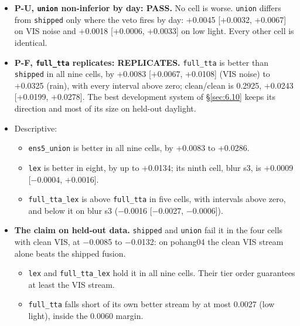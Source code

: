 \documentclass[10pt]{article}
\begin{document}
\begin{itemize}
\item \textbf{P-U, \texttt{union} non-inferior by day: PASS.} No cell is worse. \texttt{union} differs from \texttt{shipped} only where the veto fires by day: +0.0045 [+0.0032, +0.0067] on VIS noise and +0.0018 [+0.0006, +0.0033] on low light. Every other cell is identical.
\item \textbf{P-F, \texttt{full\_\allowbreak{}tta} replicates: REPLICATES.} \texttt{full\_\allowbreak{}tta} is better than \texttt{shipped} in all nine cells, by +0.0083 [+0.0067, +0.0108] (VIS noise) to +0.0325 (rain), with every interval above zero; clean/clean is 0.2925, +0.0243 [+0.0199, +0.0278]. The best development system of \S\ref{sec:6.10} keeps its direction and most of its size on held-out daylight.
\item Descriptive:
\begin{itemize}
\item \texttt{ens5\_\allowbreak{}union} is better in all nine cells, by +0.0083 to +0.0286.
\item \texttt{lex} is better in eight, by up to +0.0134; its ninth cell, blur s3, is +0.0009 [$-$0.0004, +0.0016].
\item \texttt{full\_\allowbreak{}tta\_\allowbreak{}lex} is above \texttt{full\_\allowbreak{}tta} in five cells, with intervals above zero, and below it on blur s3 ($-$0.0016 [$-$0.0027, $-$0.0006]).
\end{itemize}
\item \textbf{The claim on held-out data.} \texttt{shipped} and \texttt{union} fail it in the four cells with clean VIS, at $-$0.0085 to $-$0.0132: on pohang04 the clean VIS stream alone beats the shipped fusion.
\begin{itemize}
\item \texttt{lex} and \texttt{full\_\allowbreak{}tta\_\allowbreak{}lex} hold it in all nine cells. Their tier order guarantees at least the VIS stream.
\item \texttt{full\_\allowbreak{}tta} falls short of its own better stream by at most 0.0027 (low light), inside the 0.0060 margin.
\end{itemize}
\end{itemize}
\end{document}
